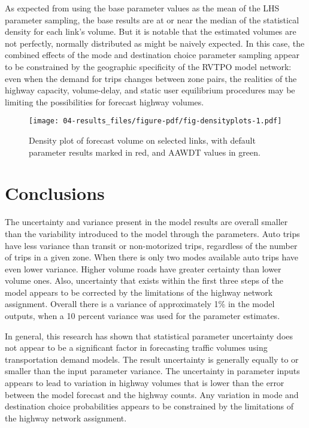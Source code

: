 \documentclass[
  letterpaper,
]{trb}
\begin{document}
As expected from using the base parameter values as the mean of the LHS
parameter sampling, the base results are at or near the median of the
statistical density for each link's volume. But it is notable that the
estimated volumes are not perfectly, normally distributed as might be
naively expected. In this case, the combined effects of the mode and
destination choice parameter sampling appear to be constrained by the
geographic specificity of the RVTPO model network: even when the demand
for trips changes between zone pairs, the realities of the highway
capacity, volume-delay, and static user equilibrium procedures may be
limiting the possibilities for forecast highway volumes.

\begin{figure}

{\centering \texttt{[image: 04-results\_files/figure-pdf/fig-densityplots-1.pdf]}

}

\caption{\label{fig-densityplots}Density plot of forecast volume on
selected links, with default parameter results marked in red, and AAWDT
values in green.}

\end{figure}


\hypertarget{sec-conclusions}{%
\section{Conclusions}\label{sec-conclusions}}

The uncertainty and variance present in the model results are overall
smaller than the variability introduced to the model through the
parameters. Auto trips have less variance than transit or non-motorized
trips, regardless of the number of trips in a given zone. When there is
only two modes available auto trips have even lower variance. Higher
volume roads have greater certainty than lower volume ones. Also,
uncertainty that exists within the first three steps of the model
appears to be corrected by the limitations of the highway network
assignment. Overall there is a variance of approximately 1\% in the
model outputs, when a 10 percent variance was used for the parameter
estimates.

In general, this research has shown that statistical parameter
uncertainty does not appear to be a significant factor in forecasting
traffic volumes using transportation demand models. The result
uncertainty is generally equally to or smaller than the input parameter
variance. The uncertainty in parameter inputs appears to lead to
variation in highway volumes that is lower than the error between the
model forecast and the highway counts. Any variation in mode and
destination choice probabilities appears to be constrained by the
limitations of the highway network assignment.
\end{document}
